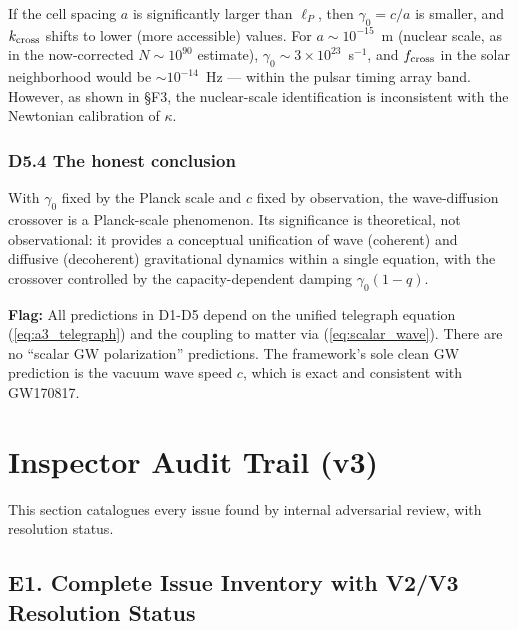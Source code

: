 \documentclass[reprint]{revtex4-2}
\begin{document}
If the cell spacing $a$ is significantly larger than $\ell_P$, then $\gamma_0 = c/a$ is smaller, and $k_{\rm cross}$ shifts to lower (more accessible) values. For $a \sim 10^{-15}$~m (nuclear scale, as in the now-corrected $N\sim 10^{90}$ estimate), $\gamma_0 \sim 3\times 10^{23}$~s$^{-1}$, and $f_{\rm cross}$ in the solar neighborhood would be $\sim 10^{-14}$~Hz --- within the pulsar timing array band. However, as shown in \S F3, the nuclear-scale identification is inconsistent with the Newtonian calibration of $\kappa$.

\subsubsection{D5.4 The honest conclusion}

With $\gamma_0$ fixed by the Planck scale and $c$ fixed by observation, the wave-diffusion crossover is a Planck-scale phenomenon. Its significance is theoretical, not observational: it provides a conceptual unification of wave (coherent) and diffusive (decoherent) gravitational dynamics within a single equation, with the crossover controlled by the capacity-dependent damping $\gamma_0(1-q)$.

\textbf{Flag:} All predictions in D1-D5 depend on the unified telegraph equation (\ref{eq:a3_telegraph}) and the coupling to matter via (\ref{eq:scalar_wave}). There are no ``scalar GW polarization'' predictions. The framework's sole clean GW prediction is the vacuum wave speed $c$, which is exact and consistent with GW170817.

\section{Inspector Audit Trail (v3)}

This section catalogues every issue found by internal adversarial review, with resolution status.

\subsection{E1. Complete Issue Inventory with V2/V3 Resolution Status}
\end{document}
